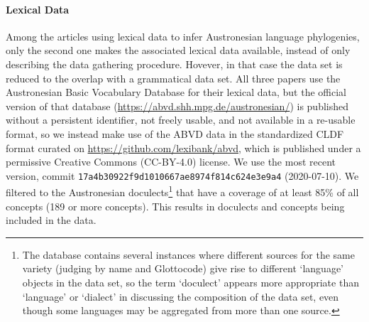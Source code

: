 \documentclass[]{rsos}%
\begin{document}
\paragraph{Lexical Data}
Among the articles using lexical data to infer Austronesian language phylogenies, only the second one
\parencite{greenhill2018population} makes the associated lexical data available, instead of only describing the data gathering procedure.
Hovever, in that case the data set is reduced to the overlap with a grammatical data set.
All three papers use the Austronesian Basic Vocabulary Database for their lexical data, but the official version of that database
(\url{https://abvd.shh.mpg.de/austronesian/}) is published without a persistent identifier, not freely usable, and not available in a re-usable format, so we instead make use of the ABVD
data in the standardized CLDF format \parencite{cldf} curated on \url{https://github.com/lexibank/abvd}, which is published under a
permissive Creative Commons (CC-BY-4.0) license. We use the most recent version, commit \texttt{17a4b30922f9d1010667ae8974f814c624e3e9a4}
(2020-07-10). We filtered to the Austronesian doculects\footnote{The database contains several instances where different
sources for the same variety (judging by name and Glottocode) give rise to different ‘language’ objects in the data set, so the term
‘doculect’ appears more appropriate than ‘language’ or ‘dialect’ in discussing the composition of the data set, even though some languages may be aggregated from more than one source.} that have a coverage
of at least 85\% of all concepts (189 or more concepts). This results in \countlects{} doculects and \countconcepts{} concepts being included in the data.
\end{document}

